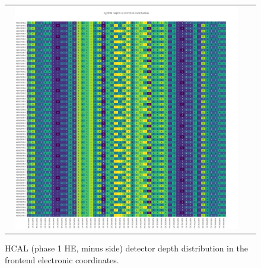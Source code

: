 \clearpage
\begin{figure}[htb]
 \begin{center}
  \begin{tabular}{cc}
   \includegraphics[angle=0,width=0.95\textwidth]{figures/appendix/ngHEM_Depth_in_FrontEnd.png}
  \end{tabular}
  \caption{HCAL (phase 1 HE, minus side) detector depth distribution in the frontend electronic coordinates.}
  \label{fig:lmapngHEMDepthFEC}
 \end{center}
\end{figure}

